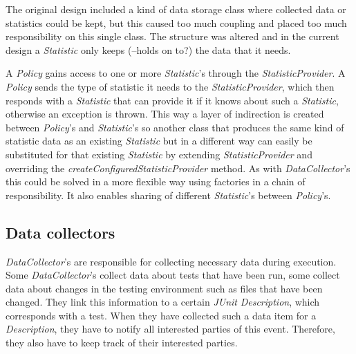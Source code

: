 \documentclass[i2]{oss}
\newcommand{\class}[1]{\emph{#1}}
\newcommand{\method}[1]{\emph{#1}}
\newcommand{\junit}{\emph{JUnit }}
\begin{document}
The original design included a kind of data storage class where collected
data or statistics could be kept, but this caused too much coupling
and placed too much responsibility on this single class.
The structure was altered and in the current design a \class{Statistic}
only keeps (--holds on to?) the data that it needs.

A \class{Policy} gains access to one or more \class{Statistic}'s through
the \class{StatisticProvider}.
A \class{Policy} sends the type of statistic it needs to the 
\class{StatisticProvider}, which then responds with a \class{Statistic}
that can provide it if it knows about such a \class{Statistic}, otherwise
an exception is thrown.
This way a layer of indirection is created between \class{Policy}'s and
\class{Statistic}'s so another class that produces the same kind of 
statistic data as an existing \class{Statistic} but in a different way 
can easily be substituted for that existing \class{Statistic} by 
extending \class{StatisticProvider} and overriding the 
\method{createConfiguredStatisticProvider} method.
As with \class{DataCollector}'s this could be solved in a more flexible
way using factories in a chain of responsibility.
It also enables sharing of different \class{Statistic}'s between 
\class{Policy}'s. \\

\subsection{Data collectors}
\label{subssec:Data collectors}

\class{DataCollector}'s are responsible for collecting necessary data 
during execution.
Some \class{DataCollector}'s collect data about tests that have been 
run, some collect data about changes in the testing environment such as 
files that have been changed.
They link this information to a certain \junit \class{Description}, which corresponds with a test.
When they have collected such a data item for a \class{Description}, they have to notify all interested parties of this event.
Therefore, they also have to keep track of their interested parties.
\end{document}

